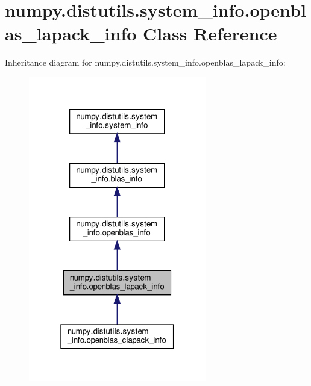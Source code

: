 \hypertarget{classnumpy_1_1distutils_1_1system__info_1_1openblas__lapack__info}{}\section{numpy.\+distutils.\+system\+\_\+info.\+openblas\+\_\+lapack\+\_\+info Class Reference}
\label{classnumpy_1_1distutils_1_1system__info_1_1openblas__lapack__info}


Inheritance diagram for numpy.\+distutils.\+system\+\_\+info.\+openblas\+\_\+lapack\+\_\+info\+:
\nopagebreak
\begin{figure}[H]
\begin{center}
\leavevmode
\includegraphics[width=220pt]{classnumpy_1_1distutils_1_1system__info_1_1openblas__lapack__info__inherit__graph}
\end{center}
\end{figure}


